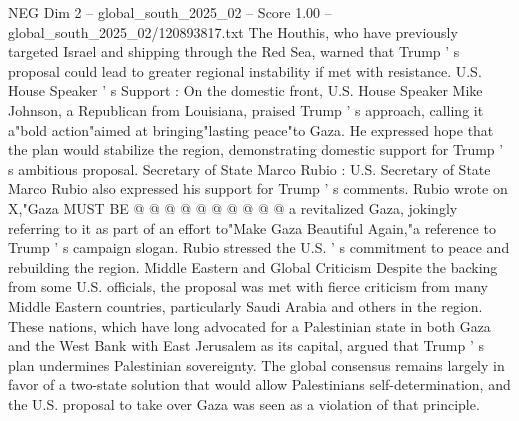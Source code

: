\begin{textsample}{NEG Dim 2 – global\_south\_2025\_02 – Score 1.00 – global\_south\_2025\_02/120893817.txt}
The Houthis, who have previously targeted Israel and shipping through the Red Sea, warned that Trump ' s proposal could lead to greater regional instability if met with resistance.
U.S.
House Speaker ' s Support : On the domestic front, U.S.
House Speaker Mike Johnson, a Republican from Louisiana, praised Trump ' s approach, calling it a"bold action"aimed at bringing"lasting peace"to Gaza.
He expressed hope that the plan would stabilize the region, demonstrating domestic support for Trump ' s ambitious proposal.
Secretary of State Marco Rubio : U.S.
Secretary of State Marco Rubio also expressed his support for Trump ' s comments.
Rubio wrote on X,"Gaza MUST BE @ @ @ @ @ @ @ @ @ @ a revitalized Gaza, jokingly referring to it as part of an effort to"Make Gaza Beautiful Again,"a reference to Trump ' s campaign slogan.
Rubio stressed the U.S. ' s commitment to peace and rebuilding the region.
Middle Eastern and Global Criticism Despite the backing from some U.S. officials, the proposal was met with fierce criticism from many Middle Eastern countries, particularly Saudi Arabia and others in the region.
These nations, which have long advocated for a Palestinian state in both Gaza and the West Bank with East Jerusalem as its capital, argued that Trump ' s plan undermines Palestinian sovereignty.
The global consensus remains largely in favor of a two-state solution that would allow Palestinians self-determination, and the U.S. proposal to take over Gaza was seen as a violation of that principle.

\end{textsample}
